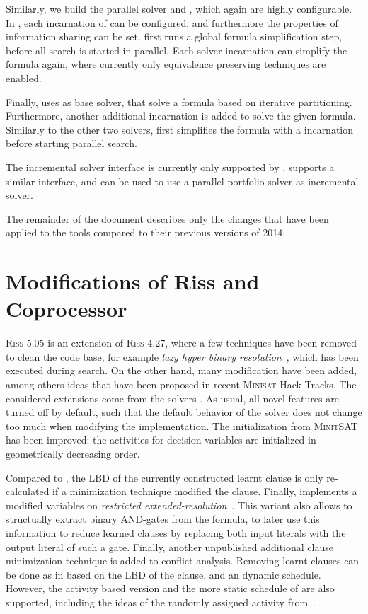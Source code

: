 \documentclass[conference]{IEEEtran}
\begin{document}
Similarly, we build the parallel solver \priss and \pcasso, which again are highly configurable. 
In \priss, each incarnation of \riss can be configured, and furthermore the properties of information sharing can be set. 
\priss first runs a global formula simplification step, before all search is started in parallel. 
Each solver incarnation can simplify the formula again, where currently only equivalence preserving techniques are enabled. 

Finally, \pcasso uses \priss as base solver, that solve a formula based on iterative partitioning. 
Furthermore, another additional \priss incarnation is added to solve the given formula. 
Similarly to the other two solvers, \pcasso first simplifies the formula with a \coprocessor incarnation before starting parallel search.

The incremental solver interface is currently only supported by \riss. 
\priss supports a similar interface, and can be used to use a parallel portfolio solver as incremental solver. 

The remainder of the document describes only the changes that have been applied to the tools compared to their previous versions of 2014.

\section{Modifications of Riss and Coprocessor}

\textsc{Riss 5.05} is an extension of \textsc{Riss 4.27}, where a few techniques have been removed to clean the code base, for example \emph{lazy hyper binary resolution}~\cite{precosat}, which has been executed during search. 
On the other hand, many modification have been added, among others ideas that have been proposed in recent \textsc{Minisat}-Hack-Tracks. 
The considered extensions come from the solvers . 
As usual, all novel features are turned off by default, such that the default behavior of the solver does not change too much when modifying the implementation. 
The initialization from \textsc{MinitSAT} has been improved: the activities for decision variables are initialized in geometrically decreasing order. 

Compared to \glucose, the LBD of the currently constructed learnt clause is only re-calculated if a minimization technique modified the clause.
Finally, \riss implements a modified variables on \emph{restricted extended-resolution}~\cite{glucoseER,dedtreff2014}. 
This variant also allows to structually extract binary AND-gates from the formula, to later use this information to reduce learned clauses by replacing both input literals with the output literal of such a gate. 
Finally, another unpublished additional clause minimization technique is added to conflict analysis. 
Removing learnt clauses can be done as in \glucose based on the LBD of the clause, and an dynamic schedule. 
However, the activity based version and the more static schedule of \minisat are also supported, including the ideas of the randomly assigned activity from~\cite{frenchPaper}. 
\end{document}
